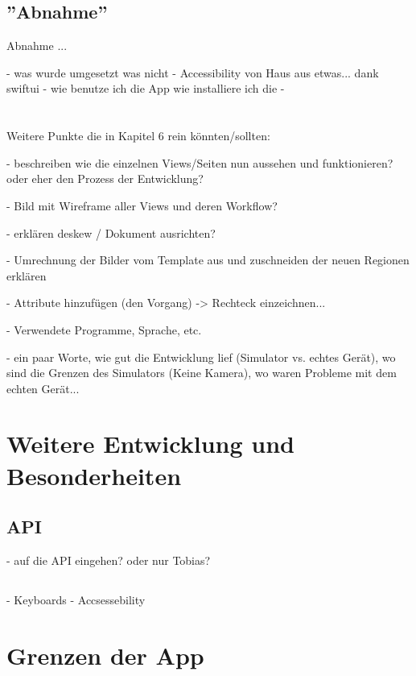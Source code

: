\documentclass[nomenclature, oneside, 150]{HSMW-Thesis}
\begin{document}
		
	\section{''Abnahme''}	
		Abnahme ... 
		
	- was wurde umgesetzt was nicht
	- Accessibility 	von Haus aus etwas... dank swiftui
	- wie benutze ich die App wie installiere ich die
	- 
		\\ \\ \\
	Weitere Punkte die in Kapitel 6 rein könnten/sollten: 
	
	- beschreiben wie die einzelnen Views/Seiten nun aussehen und funktionieren? oder eher den Prozess der Entwicklung?
	
	- Bild mit Wireframe aller Views und deren Workflow?
	
	- erklären deskew / Dokument ausrichten?
	
	- Umrechnung der Bilder vom Template aus und zuschneiden der neuen Regionen erklären
	
	- Attribute hinzufügen (den Vorgang) -> Rechteck einzeichnen...
	
	- Verwendete Programme, Sprache, etc. 
	
	- ein paar Worte, wie gut die Entwicklung lief (Simulator vs. echtes Gerät), wo sind die Grenzen des Simulators (Keine Kamera), wo waren Probleme mit dem echten Gerät...


\chapter{Weitere Entwicklung und Besonderheiten}
	
	\section{API}
		- auf die API eingehen? oder nur Tobias?
	
	\section{}
		- Keyboards
		- Accsessebility
		

\chapter{Grenzen der App}
\end{document}
